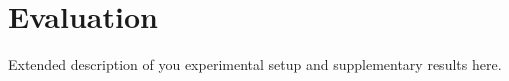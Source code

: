 \chapter{Evaluation}

Extended description of you experimental setup and supplementary results here.
